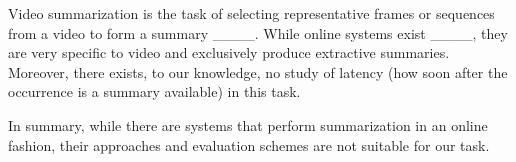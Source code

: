 Video summarization is the task of selecting representative frames or sequences from a video to form a summary ____. While online systems exist ____, they are very specific to video and exclusively produce extractive summaries. Moreover, there exists, to our knowledge, no study of latency (how soon after the occurrence is a summary available) in this task.


In summary, while there are systems that perform summarization in an online fashion, their approaches and evaluation schemes are not suitable for our task.


